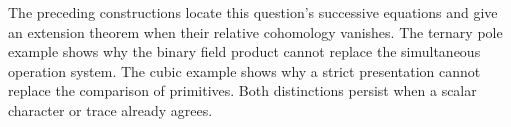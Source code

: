 The preceding constructions locate this question's successive
equations and give an extension theorem when their relative
cohomology vanishes. The ternary pole example shows why the
binary field product cannot replace the simultaneous operation
system. The cubic example shows why a strict presentation cannot
replace the comparison of primitives. Both distinctions persist
when a scalar character or trace already agrees.
